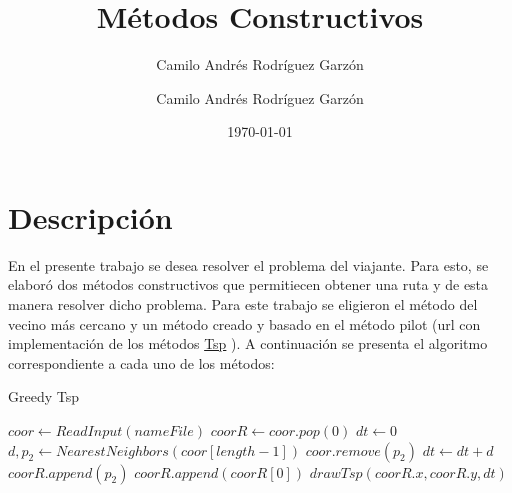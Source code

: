 \documentclass{article}
\title{Métodos Constructivos}
\author{Camilo Andrés Rodríguez Garzón}
\author{Camilo Andrés Rodríguez Garzón}
\date{\today}
\begin{document}
	\maketitle
	
	\section{Descripción}
	En el presente trabajo se desea resolver el problema del viajante. Para esto, se elaboró dos métodos constructivos que permitiecen obtener una ruta y de esta manera resolver dicho problema. Para este trabajo se eligieron el método del vecino más cercano y un método creado y basado en el método pilot (url con implementación de los métodos \href{https://github.com/camilorodriguezga/Tsp}{Tsp}
	). A continuación se presenta el algoritmo correspondiente a cada uno de los métodos:
	
	\begin{algorithm}[H]
		\caption{Greedy Tsp}\label{GreedyTsp}
		\begin{algorithmic}[1]
			\State $coor \gets ReadInput(nameFile)$ 
			\State $coorR \gets coor.pop(0)$ 
			\State $dt \gets 0$ 
			\State $d, p_2 \gets NearestNeighbors(coor[length - 1])$ 
			\State $coor.remove(p_2)$ 
			\State $dt \gets dt + d$
			\State $coorR.append(p_2)$
			\EndWhile\label{euclidendwhile}
			\State $coorR.append(coorR[0])$ 
			\State $drawTsp(coorR.x, coorR.y, dt)$
			\EndProcedure
		\end{algorithmic}
	\end{algorithm}
	
\end{document}
